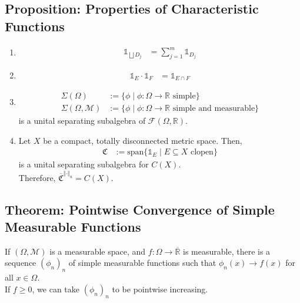 \documentclass[10pt]{extarticle}
\newcommand{\R}{\mathbb{R}}
\newcommand{\norm}[1]{\left\Vert #1 \right\Vert}
\begin{document}
  \subsection{Proposition: Properties of Characteristic Functions}%
  \begin{enumerate}[(1)]
    \item 
      \begin{align*}
        \mathbb{1}_{\bigsqcup D_j} &= \sum_{j=1}^{m}\mathbb{1}_{D_j}
      \end{align*}
    \item 
      \begin{align*}
        \mathbb{1}_E \cdot \mathbb{1}_F &= \mathbb{1}_{E\cap F}
      \end{align*}
    \item 
      \begin{align*}
        \Sigma(\Omega) &:= \{\phi\mid \phi: \Omega \rightarrow \R \text{ simple}\}\\
        \Sigma(\Omega,\mathcal{M}) &:= \{\phi\mid \phi: \Omega \rightarrow \R \text{ simple and measurable}\}
      \end{align*}
      is a unital separating subalgebra of $\mathcal{F}(\Omega,\R)$.
    \item Let $X$ be a compact, totally disconnected metric space. Then,
      \begin{align*}
        \mathfrak{C} &:= \text{span}\{\mathbb{1}_{E}\mid E\subseteq X\text{ clopen}\}
      \end{align*}
      is a unital separating subalgebra for $C(X)$.\\

      Therefore, $\overline{\mathfrak{C}}^{\norm{\cdot}_u} = C(X)$.
  \end{enumerate}
  \subsection{Theorem: Pointwise Convergence of Simple Measurable Functions}%
  If $(\Omega,\mathcal{M})$ is a measurable space, and $f: \Omega \rightarrow \overline{\R}$ is measurable, there is a sequence $(\phi_n)_n$ of simple measurable functions such that $\phi_n(x) \rightarrow f(x)$ for all $x\in \Omega$.\\

  If $f \geq 0$, we can take $(\phi_n)_n$ to be pointwise increasing.\\
\end{document}
